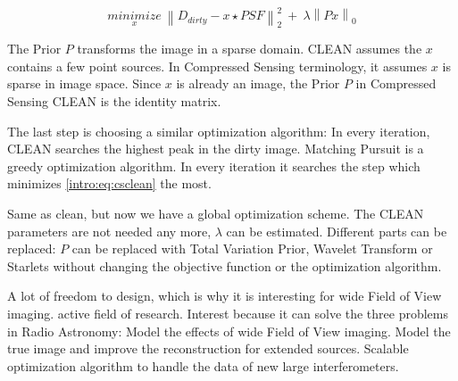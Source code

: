 \begin{equation}\label{intro:eq:csclean}
	\underset{x}{minimize} \: \left \| D_{dirty} - x \star PSF \right \|_2^2 \: + \: \lambda \left \| Px \right \|_0
\end{equation}

The Prior $P$ transforms the image in a sparse domain. CLEAN assumes the $x$ contains a few point sources. In Compressed Sensing terminology, it assumes $x$ is sparse in image space. Since $x$ is already an image, the Prior $P$ in Compressed Sensing CLEAN is the identity matrix.  

The last step is choosing a similar optimization algorithm: In every iteration, CLEAN searches the highest peak in the dirty image. Matching Pursuit is a greedy optimization algorithm. In every iteration it searches the step which minimizes \eqref{intro:eq:csclean} the most.


Same as clean, but now we have a global optimization scheme. The CLEAN parameters are not needed any more, $\lambda$ can be estimated. Different parts can be replaced: $P$ can be replaced with Total Variation Prior, Wavelet Transform or Starlets without changing the objective function or the optimization algorithm. 

A lot of freedom to design, which is why it is interesting for wide Field of View imaging. active field of research. Interest because it can solve the three problems in Radio Astronomy:
Model the effects of wide Field of View imaging.
Model the true image and improve the reconstruction for extended sources.
Scalable optimization algorithm to handle the data of new large interferometers.


